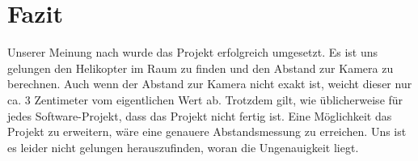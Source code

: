 \chapter{Fazit}
\label{cha:faiz}

Unserer Meinung nach wurde das Projekt erfolgreich umgesetzt. Es ist uns gelungen den Helikopter im Raum zu finden und den Abstand zur Kamera zu berechnen. Auch wenn der Abstand zur Kamera nicht exakt ist, weicht dieser nur ca. 3 Zentimeter vom eigentlichen Wert ab. Trotzdem gilt, wie üblicherweise für jedes Software-Projekt, dass das Projekt nicht fertig ist. Eine Möglichkeit das Projekt zu erweitern, wäre eine genauere Abstandsmessung zu erreichen. Uns ist es leider nicht gelungen herauszufinden, woran die Ungenauigkeit liegt.